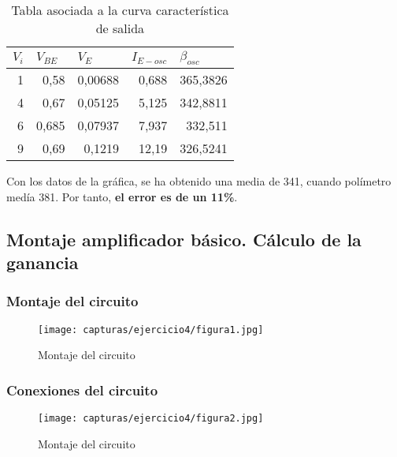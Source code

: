 \begin{table}[htbp]
	\centering
	\begin{tabular}{rrrrr}
		\multicolumn{1}{l}{\textbf{$ V_{i} $ }} & \multicolumn{1}{l}{\textbf{$ V_{BE} $ }} & \multicolumn{1}{l}{\textbf{$ V_{E} $ }} & \multicolumn{1}{l}{\textbf{$ I_{E-osc} $ }} & \multicolumn{1}{l}{\textbf{$ \beta_{osc} $}} \\
		\midrule
		1     & 0,58  & 0,00688 & 0,688 & 365,3826 \\
		4     & 0,67  & 0,05125 & 5,125 & 342,8811 \\
		6     & 0,685 & 0,07937 & 7,937 & 332,511 \\
		9     & 0,69  & 0,1219 & 12,19 & 326,5241 \\
	\end{tabular}%
	\caption{Tabla asociada a la curva característica de salida}
	\label{tab:tabla4a}%
\end{table}%

Con los datos de la gráfica, se ha obtenido una media de 341, cuando polímetro medía 381. Por tanto, \textbf{el error es de un 11\%}.


\newpage


\subsection{Montaje amplificador básico. Cálculo de la ganancia}

\subsubsection{Montaje del circuito}

\begin{figure}[H] %
	\centering
	\texttt{[image: capturas/ejercicio4/figura1.jpg]} 
	\caption{Montaje del circuito}
	\label{fig:practica4-b-1}
\end{figure}

\subsubsection{Conexiones del circuito}

\begin{figure}[H] %
	\centering
	\texttt{[image: capturas/ejercicio4/figura2.jpg]} 
	\caption{Montaje del circuito}
	\label{fig:practica4-b-2}
\end{figure}


